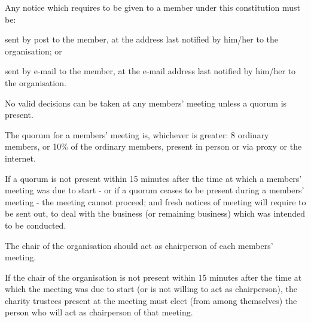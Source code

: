 ﻿\documentclass[a4paper,11pt,onecolumn ]{article}
\begin{document}
\begin{legal}
\item Any notice which requires to be given to a member under this constitution must be:
    \begin{legal}
        \item sent by post to the member, at the address last notified by him/her to the organisation; or 
        \item sent by e-mail to the member, at the e-mail address last notified by him/her to the organisation.
    \end{legal}
\end{legal}

\begin{legal}
\item No valid decisions can be taken at any members' meeting unless a quorum is present. 
\item The quorum for a members' meeting is, whichever is greater: 8 ordinary members, or 10\% of the ordinary members, present in person or via proxy or the internet.
\item If a quorum is not present within 15 minutes after the time at which a members' meeting was due to start - or if a quorum ceases to be present during a members' meeting - the meeting cannot proceed; and fresh notices of meeting will require to be sent out, to deal with the business (or remaining business) which was intended to be conducted. 
\item The chair of the organisation should act as chairperson of each members' meeting.
\item If the chair of the organisation is not present within 15 minutes after the time at which the meeting was due to start (or is not willing to act as chairperson), the charity trustees present at the meeting must elect (from among themselves) the person who will act as chairperson of that meeting.
\end{legal}
\end{document}
